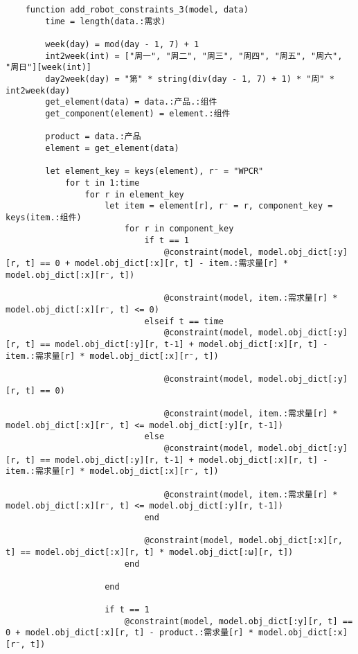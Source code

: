 \begin{appendices}
\begin{lstlisting}
    function add_robot_constraints_3(model, data)
        time = length(data.:需求)

        week(day) = mod(day - 1, 7) + 1
        int2week(int) = ["周一", "周二", "周三", "周四", "周五", "周六", "周日"][week(int)]
        day2week(day) = "第" * string(div(day - 1, 7) + 1) * "周" * int2week(day)
        get_element(data) = data.:产品.:组件
        get_component(element) = element.:组件

        product = data.:产品
        element = get_element(data)

        let element_key = keys(element), r⁻ = "WPCR"
            for t in 1:time
                for r in element_key
                    let item = element[r], r⁻ = r, component_key = keys(item.:组件)
                        for r in component_key
                            if t == 1
                                @constraint(model, model.obj_dict[:y][r, t] == 0 + model.obj_dict[:x][r, t] - item.:需求量[r] * model.obj_dict[:x][r⁻, t])

                                @constraint(model, item.:需求量[r] * model.obj_dict[:x][r⁻, t] <= 0)
                            elseif t == time
                                @constraint(model, model.obj_dict[:y][r, t] == model.obj_dict[:y][r, t-1] + model.obj_dict[:x][r, t] - item.:需求量[r] * model.obj_dict[:x][r⁻, t])

                                @constraint(model, model.obj_dict[:y][r, t] == 0)

                                @constraint(model, item.:需求量[r] * model.obj_dict[:x][r⁻, t] <= model.obj_dict[:y][r, t-1])
                            else
                                @constraint(model, model.obj_dict[:y][r, t] == model.obj_dict[:y][r, t-1] + model.obj_dict[:x][r, t] - item.:需求量[r] * model.obj_dict[:x][r⁻, t])

                                @constraint(model, item.:需求量[r] * model.obj_dict[:x][r⁻, t] <= model.obj_dict[:y][r, t-1])
                            end

                            @constraint(model, model.obj_dict[:x][r, t] == model.obj_dict[:x][r, t] * model.obj_dict[:ω][r, t])
                        end

                    end

                    if t == 1
                        @constraint(model, model.obj_dict[:y][r, t] == 0 + model.obj_dict[:x][r, t] - product.:需求量[r] * model.obj_dict[:x][r⁻, t])


\end{lstlisting}
\end{appendices}
